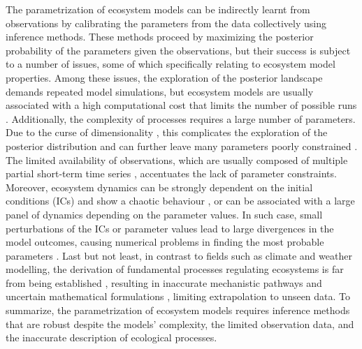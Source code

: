 The parametrization of ecosystem models can be indirectly learnt from observations by calibrating the parameters from the data collectively using inference methods. These methods proceed by maximizing the posterior probability of the parameters given the observations, but their success is subject to a number of issues, some of which specifically relating to ecosystem model properties.
%
Among these issues, the exploration of the posterior landscape demands repeated model simulations, but ecosystem models are usually associated with a high computational cost that limits the number of possible runs \citep{Fisher2018}. 
%
Additionally, the complexity of processes requires a large number of parameters. Due to the curse of dimensionality \citep{Boyd2012}, this complicates the exploration of the posterior distribution and can further leave many parameters poorly constrained \citep{Gutenkunst2007}. The limited availability of observations, which are usually composed of multiple partial short-term time series \citep{Scheiter2013,Schartau2017}, accentuates the lack of parameter constraints. 
%
Moreover, ecosystem dynamics can be strongly dependent on the initial conditions (ICs) and show a chaotic behaviour \citep{Hastings1993,Huisman1999,Beninca2008}, or can be associated with a large panel of dynamics depending on the parameter values. In such case, small perturbations of the ICs or parameter values lead to large divergences in the model outcomes, causing numerical problems in finding the most probable parameters \citep{DeAngelis2015}.
%
Last but not least, in contrast to fields such as climate and weather modelling, the derivation of fundamental processes regulating ecosystems is far from being established \citep{Gehlen2015,Schartau2017,Purves2013}, resulting in inaccurate mechanistic pathways and uncertain mathematical formulations \citep{Gentleman2003}, limiting extrapolation to unseen data.
%
To summarize, the parametrization of ecosystem models requires inference methods that are robust despite the models' complexity, the limited observation data, and the inaccurate description of ecological processes.

